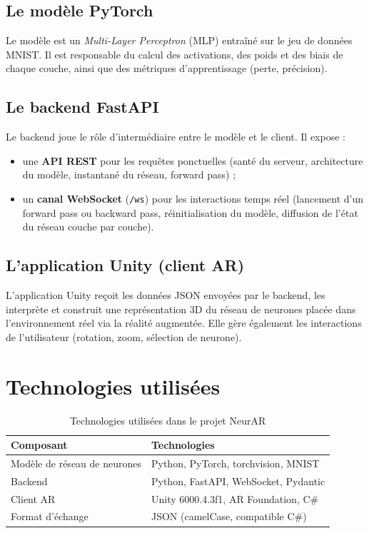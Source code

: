 \documentclass[12pt,a4paper]{report}
\begin{document}
\subsection{Le mod\`ele PyTorch}
Le mod\`ele est un \textit{Multi-Layer Perceptron} (MLP) entra\^in\'e sur le
jeu de donn\'ees MNIST. Il est responsable du calcul des activations, des
poids et des biais de chaque couche, ainsi que des m\'etriques
d'apprentissage (perte, pr\'ecision).

\subsection{Le backend FastAPI}
Le backend joue le r\^ole d'interm\'ediaire entre le mod\`ele et le client.
Il expose :
\begin{itemize}
    \item une \textbf{API REST} pour les requ\^etes ponctuelles
    (sant\'e du serveur, architecture du mod\`ele, instantan\'e du r\'eseau,
    forward pass) ;
    \item un \textbf{canal WebSocket} (\texttt{/ws}) pour les interactions
    temps r\'eel (lancement d'un forward pass ou backward pass, r\'einitialisation
    du mod\`ele, diffusion de l'\'etat du r\'eseau couche par couche).
\end{itemize}

\subsection{L'application Unity (client AR)}
L'application Unity re\c{c}oit les donn\'ees JSON envoy\'ees par le backend,
les interpr\`ete et construit une repr\'esentation 3D du r\'eseau de
neurones plac\'ee dans l'environnement r\'eel via la r\'ealit\'e augment\'ee.
Elle g\`ere \'egalement les interactions de l'utilisateur (rotation, zoom,
s\'election de neurone).

\section{Technologies utilis\'ees}

\begin{table}[h!]
\centering
\begin{tabular}{ll}
\toprule
\textbf{Composant} & \textbf{Technologies} \\
\midrule
Mod\`ele de r\'eseau de neurones & Python, PyTorch, torchvision, MNIST \\
Backend & Python, FastAPI, WebSocket, Pydantic \\
Client AR & Unity 6000.4.3f1, AR Foundation, C\# \\
Format d'\'echange & JSON (camelCase, compatible C\#) \\
\bottomrule
\end{tabular}
\caption{Technologies utilis\'ees dans le projet NeurAR}
\end{table}
\end{document}
